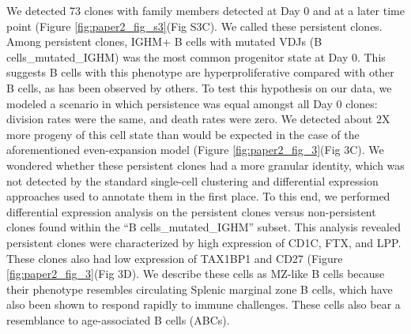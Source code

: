 We detected 73 clones with family members detected at Day 0 and at a later time point (Figure \ref{fig:paper2_fig_s3}(Fig S3C). We called these persistent clones. Among persistent clones, IGHM+ B cells with mutated VDJs (B cells\_mutated\_IGHM) was the most common progenitor state at Day 0. This suggests B cells with this phenotype are hyperproliferative compared with other B cells, as has been observed by others\cite{seifert_functional_2015}. To test this hypothesis on our data, we modeled a scenario in which persistence was equal amongst all Day 0 clones: division rates were the same, and death rates were zero. We detected about 2X more progeny of this cell state than would be expected in the case of the aforementioned even-expansion model (Figure \ref{fig:paper2_fig_3}(Fig 3C). We wondered whether these persistent clones had a more granular identity, which was not detected by the standard single-cell clustering and differential expression approaches used to annotate them in the first place. To this end, we performed differential expression analysis on the persistent clones versus non-persistent clones found within the “B cells\_mutated\_IGHM” subset. This analysis revealed persistent clones were characterized by high expression of CD1C, FTX, and LPP. These clones also had low expression of TAX1BP1 and CD27 (Figure \ref{fig:paper2_fig_3}(Fig 3D). We describe these cells as MZ-like B cells because their phenotype resembles circulating Splenic marginal zone B cells, which have also been shown to respond rapidly to immune challenges\cite{weller_human_2004}. These cells also bear a resemblance to age-associated B cells (ABCs)\cite{cancro_age-associated_2020}.

